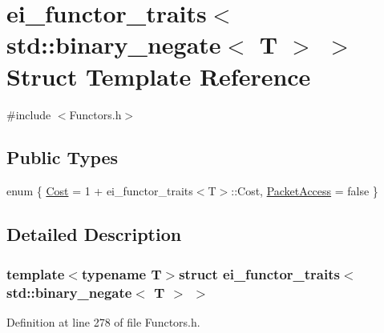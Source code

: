 \hypertarget{structei__functor__traits_3_01std_1_1binary__negate_3_01_t_01_4_01_4}{\section{ei\-\_\-functor\-\_\-traits$<$ std\-:\-:binary\-\_\-negate$<$ T $>$ $>$ Struct Template Reference}
\label{structei__functor__traits_3_01std_1_1binary__negate_3_01_t_01_4_01_4}
}


{\ttfamily \#include $<$Functors.\-h$>$}

\subsection*{Public Types}
\begin{DoxyCompactItemize}
\item 
enum \{ \hyperlink{structei__functor__traits_3_01std_1_1binary__negate_3_01_t_01_4_01_4_aff1e6fa6ac0fb16698797f6926d45a87aafb36a64a04cdc10862294275c1a4cce}{Cost} = 1 + ei\-\_\-functor\-\_\-traits$<$T$>$\-:\-:Cost, 
\hyperlink{structei__functor__traits_3_01std_1_1binary__negate_3_01_t_01_4_01_4_aff1e6fa6ac0fb16698797f6926d45a87a82aba997357bbfb0ac4e61dc225c6c41}{Packet\-Access} = false
 \}
\end{DoxyCompactItemize}


\subsection{Detailed Description}
\subsubsection*{template$<$typename T$>$struct ei\-\_\-functor\-\_\-traits$<$ std\-::binary\-\_\-negate$<$ T $>$ $>$}



Definition at line 278 of file Functors.\-h.



